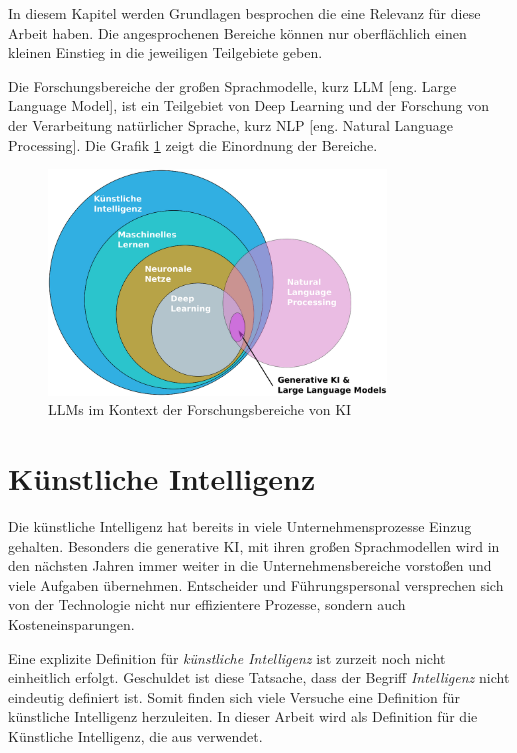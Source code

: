 In diesem Kapitel werden Grundlagen besprochen die eine Relevanz für diese Arbeit haben. Die angesprochenen Bereiche können nur oberflächlich einen kleinen Einstieg in die jeweiligen Teilgebiete geben.\vspace{0.2cm}

Die Forschungsbereiche der großen Sprachmodelle, kurz \acrshort{LLM} [eng. Large Language Model], ist ein Teilgebiet von Deep Learning und der Forschung von der Verarbeitung natürlicher Sprache, kurz \acrshort{NLP} [eng. Natural Language Processing]. Die Grafik \ref{img:classification_of_terms} zeigt die Einordnung der Bereiche.

\begin{figure}[!ht]
	\includegraphics[width=0.8\textwidth]{content/chapter_basics/images/einordnung_bezeichnungen.eps}
	\centering
	\caption{LLMs im Kontext der Forschungsbereiche von KI}
	\label{img:classification_of_terms}
\end{figure}


\section{Künstliche Intelligenz}
Die künstliche Intelligenz hat bereits in viele Unternehmensprozesse Einzug gehalten. Besonders die generative KI, mit ihren großen Sprachmodellen wird in den nächsten Jahren immer weiter in die Unternehmensbereiche vorstoßen und viele Aufgaben übernehmen. Entscheider und Führungspersonal versprechen sich von der Technologie nicht nur effizientere Prozesse, sondern auch Kosteneinsparungen.\vspace{0.2cm}

Eine explizite Definition für \textit{künstliche Intelligenz} ist zurzeit noch nicht einheitlich erfolgt. Geschuldet ist diese Tatsache, dass der Begriff \textit{Intelligenz} nicht eindeutig definiert ist. Somit finden sich viele Versuche eine Definition für künstliche Intelligenz herzuleiten. In dieser Arbeit wird als Definition für die Künstliche Intelligenz, die aus \cite[6 ff.]{definition_ki2019} verwendet.

